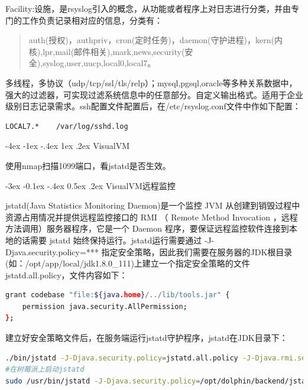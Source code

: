 \documentclass[12pt]{book}
\makeatletter
\numberwithin{dummy}{section}
\theoremstyle{ocrenumbox}
\theoremstyle{blacknumex}
\theoremstyle{blacknumbox}
\theoremstyle{ocrenum}
\renewcommand{\section}{\@startsection{section}{1}{\z@}
	{-4ex \@plus -1ex \@minus -.4ex}
	{1ex \@plus.2ex }
	{\normalfont\large\sffamily\bfseries}}
\renewcommand{\subsection}{\@startsection {subsection}{2}{\z@}
	{-3ex \@plus -0.1ex \@minus -.4ex}
	{0.5ex \@plus.2ex }
	{\normalfont\sffamily\bfseries}}
\makeatother
\begin{document}
Facility:设施，是rsyslog引入的概念，从功能或者程序上对日志进行分类，并由专门的工作负责记录相对应的信息，分类有：

\begin{quote}
auth(授权)，authpriv，cron(定时任务)，daemon(守护进程)，kern(内核),lpr,mail(邮件相关),mark,news,security(安全),syslog,user,uucp,local0,local7。	
\end{quote}

多线程，多协议（udp/tcp/ssl/tls/relp）；mysql,pgsql,oracle等多种关系数据中，强大的过滤器，可实现过滤系统信息中的任意部分。自定义输出格式。适用于企业级别日志记录需求。ssh配置文件配置后，在/etc/rsyslog.conf文件中作如下配置：

\begin{lstlisting}[language=Bash]
LOCAL7.*	/var/log/sshd.log
\end{lstlisting}

\section{VisualVM}

使用nmap扫描1099端口，看jstatd是否生效。

\subsection{VisualVM远程监控}

jstatd(Java Statistics Monitoring Daemon)是一个监控 JVM 从创建到销毁过程中资源占用情况并提供远程监控接口的 RMI （ Remote Method Invocation ，远程方法调用）服务器程序，它是一个 Daemon 程序，要保证远程监控软件连接到本地的话需要 jstatd 始终保持运行。jstatd运行需要通过 -J-Djava.security.policy=*** 指定安全策略，因此我们需要在服务器的JDK根目录(如：/opt/app/local/jdk1.8.0\_111)上建立一个指定安全策略的文件jstatd.all.policy，文件内容如下：

\begin{lstlisting}[language=Bash]
grant codebase "file:${java.home}/../lib/tools.jar" {  
	permission java.security.AllPermission;  
}; 
\end{lstlisting}


建立好安全策略文件后，在服务端运行jstatd守护程序，jstatd在JDK目录下：

\begin{lstlisting}[language=Bash]
./bin/jstatd -J-Djava.security.policy=jstatd.all.policy -J-Djava.rmi.server.hostname=10.10.1.12 -J-Djava.rmi.server.logCalls=true -p 1011
#在树莓派上启动jstatd
sudo /usr/bin/jstatd -J-Djava.security.policy=/opt/dolphin/backend/jstatd.all.policy -J-Djava.rmi.server.hostname=192.168.31.25 -J-Djava.rmi.server.logCalls=true -p 1011
\end{lstlisting}
\end{document}
